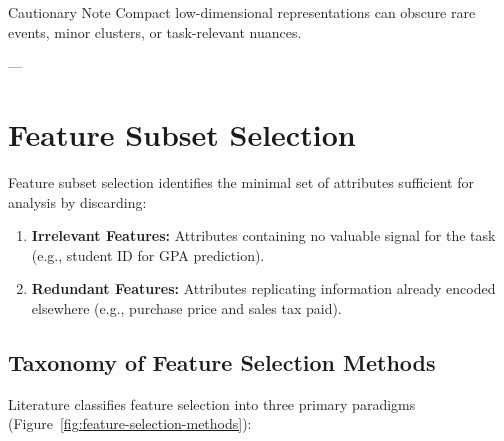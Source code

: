 \begin{alertblock}{Cautionary Note}
Compact low-dimensional representations can obscure rare events, minor clusters, or task-relevant nuances.
\end{alertblock}

---

\section{Feature Subset Selection}

Feature subset selection identifies the minimal set of attributes sufficient for analysis by discarding:
\begin{enumerate}
    \item \textbf{Irrelevant Features:} Attributes containing no valuable signal for the task (e.g., student ID for GPA prediction).
    \item \textbf{Redundant Features:} Attributes replicating information already encoded elsewhere (e.g., purchase price and sales tax paid).
\end{enumerate}

\subsection{Taxonomy of Feature Selection Methods}
Literature classifies feature selection into three primary paradigms (Figure~\ref{fig:feature-selection-methods}):

